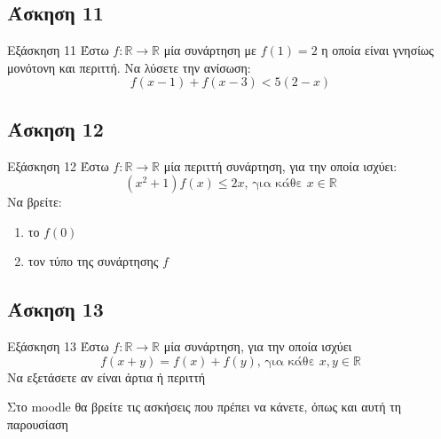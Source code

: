 \documentclass[greek]{beamer}
\begin{document}
\subsection{Άσκηση 11}
\begin{frame}[label=Άσκηση11,t]{Εξάσκηση 11}
      Έστω $f:\mathbb{R}\to\mathbb{R}$ μία συνάρτηση με $f(1)=2$ η οποία είναι γνησίως μονότονη και περιττή. Να λύσετε την ανίσωση:
      $$f(x-1)+f(x-3)<5(2-x)$$
\end{frame}

\subsection{Άσκηση 12}
\begin{frame}[label=Άσκηση12,t]{Εξάσκηση 12}
      Έστω $f:\mathbb{R}\to\mathbb{R}$ μία περιττή συνάρτηση, για την οποία ισχύει:
      $$(x^2+1)f(x)\le 2x \text{, για κάθε } x\in\mathbb{R}$$
      Να βρείτε:
      \begin{enumerate}
            \item το $f(0)$ \pause
            \item τον τύπο της συνάρτησης $f$
      \end{enumerate}
\end{frame}

\subsection{Άσκηση 13}
\begin{frame}[label=Άσκηση13,t]{Εξάσκηση 13}
      Έστω $f:\mathbb{R}\to\mathbb{R}$ μία συνάρτηση, για την οποία ισχύει
      $$f(x+y)=f(x)+f(y)\text{, για κάθε } x,y\in\mathbb{R}$$
      Να εξετάσετε αν είναι άρτια ή περιττή
\end{frame}

\begin{frame}
      Στο moodle θα βρείτε τις ασκήσεις που πρέπει να κάνετε, όπως και αυτή τη παρουσίαση
\end{frame}
\end{document}
